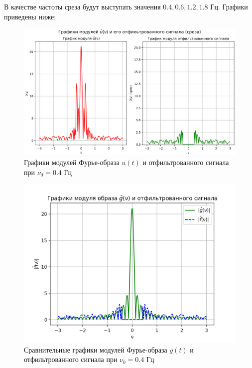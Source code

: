 В качестве частоты среза будут выступать значения $0.4, 0.6, 1.2, 1.8$ Гц. Графики приведены ниже:

\begin{figure}[ht!]
    \centering
    \includegraphics[scale=0.5]{media/1 task/low_freq/Fourier_Image_4_2_2_-0,4.png}
    \caption{Графики модулей Фурье-образа $u(t)$ и отфильтрованного сигнала при $\nu_0=0.4$ Гц}
    \label{fig:four_4_2_2_0.4}
\end{figure}

\begin{figure}[ht!]
    \centering
    \includegraphics[scale=0.55]{media/1 task/low_freq/Fourier_Image_Comparison_4_2_2_-0,4.png}
    \caption{Сравнительные графики модулей Фурье-образа $g(t)$ и отфильтрованного сигнала при $\nu_0=0.4$ Гц}
    \label{fig:fourc_4_2_2_0.4}
\end{figure}

